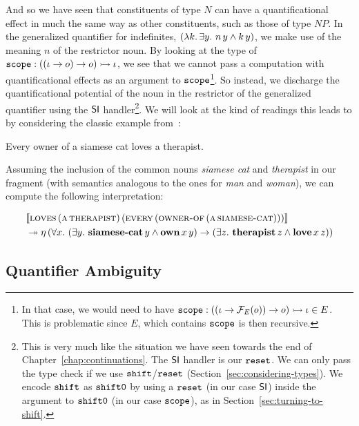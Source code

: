 And so we have seen that constituents of type $N$ can have a
quantificational effect in much the same way as other constituents, such as
those of type $NP$. In the generalized quantifier for indefinites,
$(\lambda k.\, \exists y.\ n\,y \land k\,y)$, we make use of the
meaning $n$ of the restrictor noun. By looking at the type of
$\mathtt{scope} : ((\iota \to o) \to o) \rightarrowtail \iota$, we see that we
cannot pass a computation with quantificational effects as an argument to
$\mathtt{scope}$\footnote{In that case, we would need to have
  $\mathtt{scope} : ((\iota \to \mathcal{F}_E(o)) \to o) \rightarrowtail \iota \in E$. This is
  problematic since $E$, which contains $\mathtt{scope}$ is then
  recursive.}. So instead, we discharge the quantificational potential of
the noun in the restrictor of the generalized quantifier using the $\textsf{SI}$
handler\footnote{This is very much like the situation we have seen towards
  the end of Chapter~\ref{chap:continuations}. The $\textsf{SI}$ handler is our
  $\mathtt{reset}$. We can only pass the type check if we use $\mathtt{shift}$/$\mathtt{reset}$
  (Section~\ref{sec:considering-types}). We encode $\mathtt{shift}$ as $\mathtt{shift0}$ by
  using a $\mathtt{reset}$ (in our case $\textsf{SI}$) inside the argument to $\mathtt{shift0}$ (in
  our case $\mathtt{scope}$), as in Section~\ref{sec:turning-to-shift}.}. We
will look at the kind of readings this leads to by considering the classic
example from~\cite{burchardt2004computational}:

\begin{exe}
  \ex Every owner of a siamese cat loves a therapist. \label{ex:siamese}
\end{exe}

Assuming the inclusion of the common nouns \emph{siamese cat} and
\emph{therapist} in our fragment (with semantics analogous to the ones for
\emph{man} and \emph{woman}), we can compute the following interpretation:

\NoChapterPrefix
\begin{align}
& \llbracket \textsc{loves}\,(\textsc{a}\,\textsc{therapist})\,(\textsc{every}\,(\textsc{owner-of}\,(\textsc{a}\,\textsc{siamese-cat}))) \rrbracket \nonumber \\
&\twoheadrightarrow \eta\,(\forall x.\ (\exists y.\ \textbf{siamese-cat}\,y \land \textbf{own}\,x\,y) \to (\exists z.\ \textbf{therapist}\,z \land \textbf{love}\,x\,z))
\end{align}
\ChapterPrefix


\subsection{Quantifier Ambiguity}
\label{ssec:quantifier-ambiguity}

